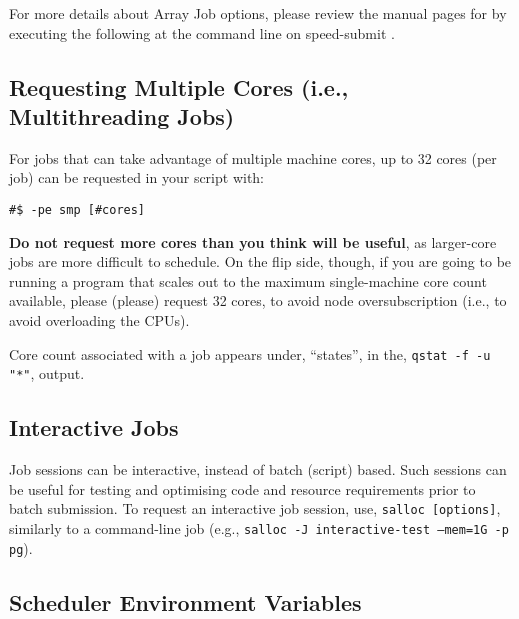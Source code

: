 For more details about Array Job options, please review the manual pages for 
 by executing the following at the command line on speed-submit 
.
 
\subsection{Requesting Multiple Cores (i.e., Multithreading Jobs)}

For jobs that can take advantage of multiple machine cores, up to 32 cores
(per job) can be requested in your script with: 

\begin{verbatim}
#$ -pe smp [#cores] 
\end{verbatim}

\textbf{Do not request more cores than you think will be useful}, as larger-core
jobs are more difficult to schedule. On the flip side, though, if you 
are going to be running a program that scales out to the maximum single-machine
core count available, please (please) request 32 cores, to avoid node 
oversubscription (i.e., to avoid overloading the CPUs).

Core count associated with a job appears under, ``states'', in the,
\texttt{qstat -f -u "*"}, output.

\subsection{Interactive Jobs}
\label{sect:interactive-jobs}

Job sessions can be interactive, instead of batch (script) based. Such 
sessions can be useful for testing and optimising code and resource 
requirements prior to batch submission. To request an interactive job 
session, use, \texttt{salloc [options]}, similarly to a 
 command-line job (e.g., \texttt{salloc -J interactive-test --mem=1G -p pg}).
%

\subsection{Scheduler Environment Variables}

